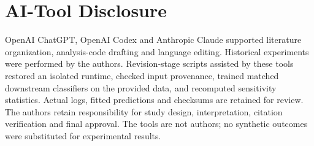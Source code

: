 \documentclass[conference]{IEEEtran}
\begin{document}
\section*{AI-Tool Disclosure}

OpenAI ChatGPT, OpenAI Codex and Anthropic Claude supported literature organization, analysis-code drafting and language editing. Historical experiments were performed by the authors. Revision-stage scripts assisted by these tools restored an isolated runtime, checked input provenance, trained matched downstream classifiers on the provided data, and recomputed sensitivity statistics. Actual logs, fitted predictions and checksums are retained for review. The authors retain responsibility for study design, interpretation, citation verification and final approval. The tools are not authors; no synthetic outcomes were substituted for experimental results.
\end{document}
